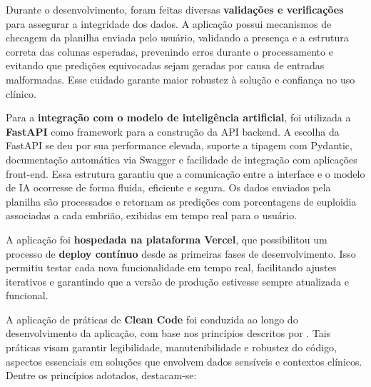 Durante o desenvolvimento, foram feitas diversas \textbf{validações e verificações} para assegurar a integridade dos dados. A aplicação possui mecanismos de checagem da planilha enviada pelo usuário, validando a presença e a estrutura correta das colunas esperadas, prevenindo erros durante o processamento e evitando que predições equivocadas sejam geradas por causa de entradas malformadas. Esse cuidado garante maior robustez à solução e confiança no uso clínico.

Para a \textbf{integração com o modelo de inteligência artificial}, foi utilizada a \textbf{FastAPI} como framework para a construção da API backend. A escolha da FastAPI se deu por sua performance elevada, suporte a tipagem com Pydantic, documentação automática via Swagger e facilidade de integração com aplicações front-end. Essa estrutura garantiu que a comunicação entre a interface e o modelo de IA ocorresse de forma fluida, eficiente e segura. Os dados enviados pela planilha são processados e retornam as predições com porcentagens de euploidia associadas a cada embrião, exibidas em tempo real para o usuário.

A aplicação foi \textbf{hospedada na plataforma Vercel}, que possibilitou um processo de \textbf{deploy contínuo} desde as primeiras fases de desenvolvimento. Isso permitiu testar cada nova funcionalidade em tempo real, facilitando ajustes iterativos e garantindo que a versão de produção estivesse sempre atualizada e funcional.

A aplicação de práticas de \textbf{Clean Code} foi conduzida ao longo do desenvolvimento da aplicação, com base nos princípios descritos por . Tais práticas visam garantir legibilidade, manutenibilidade e robustez do código, aspectos essenciais em soluções que envolvem dados sensíveis e contextos clínicos. Dentre os princípios adotados, destacam-se:

